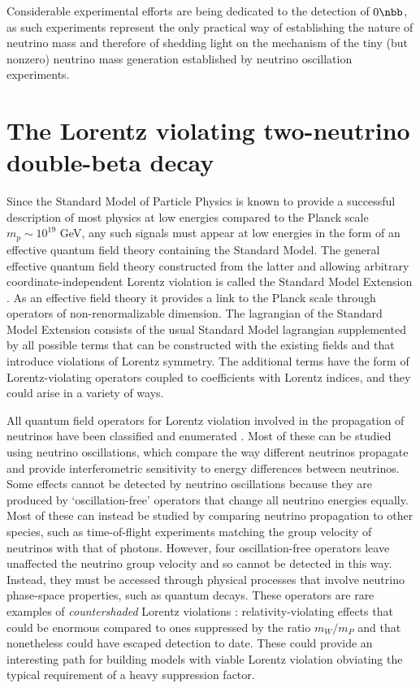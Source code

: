 Considerable experimental efforts are being dedicated to the detection of $0\nbb$, as such experiments represent the only practical way of establishing the nature of neutrino mass and therefore of shedding light on the mechanism of the tiny (but nonzero) neutrino mass generation established by neutrino oscillation experiments.

\section*{The Lorentz violating two-neutrino double-beta decay}
Since the Standard Model of Particle Physics is known to provide a successful description of most physics at low energies compared to the Planck scale $m_p\sim10^{19}$ GeV, any such signals must appear at low energies in the form of an effective quantum field theory containing the Standard Model. The general effective quantum field theory constructed from the latter and allowing arbitrary coordinate-independent Lorentz violation is called the Standard Model Extension \cite{SME1997,SME1998}. As an effective field theory it provides a link to the Planck scale through operators of non-renormalizable dimension. The lagrangian of the Standard Model Extension consists of the usual Standard Model lagrangian supplemented by all possible terms that can be constructed with the existing fields and that introduce violations of Lorentz symmetry. The additional terms have the form of Lorentz-violating operators coupled to coefficients with Lorentz indices, and they could arise in a variety of ways.

All quantum field operators for Lorentz violation involved in the propagation of neutrinos have been classified and enumerated \cite{SMEneutrinos}. Most of these can be studied using neutrino oscillations, which compare the way different neutrinos propagate and provide interferometric sensitivity to energy differences between neutrinos. Some effects cannot be detected by neutrino oscillations because they are produced by ‘oscillation-free’ operators that change all neutrino energies equally. Most of these can instead be studied by comparing neutrino propagation to other species, such as time-of-flight experiments matching the group velocity of neutrinos with that of photons. However, four oscillation-free operators leave unaffected the neutrino group velocity and so cannot be detected in this way. Instead, they must be accessed through physical processes that involve neutrino phase-space properties, such as quantum decays. These operators are rare examples of \textit{countershaded} Lorentz violations \cite{SMEcountersh}: relativity-violating effects that could be enormous compared to ones suppressed by the ratio $m_W/m_P$ and that nonetheless could have escaped detection to date. These could provide an interesting path for building models with viable Lorentz violation obviating the typical requirement of a heavy suppression factor.

